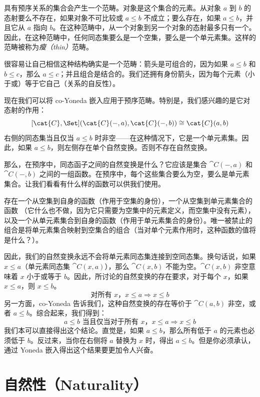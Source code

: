 具有预序关系的集合会产生一个范畴。对象是这个集合的元素。从对象 $a$ 到 $b$ 的态射要么不存在，如果对象不可比较或 $a \leqslant b$ 不成立；要么存在，如果 $a \leqslant b$，并且它从 $a$ 指向 $b$。在这种范畴中，从一个对象到另一个对象的态射最多只有一个。因此，在这种范畴中，任何同态集要么是一个空集，要么是一个单元素集。这样的范畴被称为\emph{瘦（thin）}范畴。

很容易让自己相信这种结构确实是一个范畴：箭头是可组合的，因为如果 $a \leqslant b$ 和 $b \leqslant c$，那么 $a \leqslant c$；并且组合是结合的。我们还拥有身份箭头，因为每个元素（小于或）等于它自己（关系的自反性）。

现在我们可以将 co-Yoneda 嵌入应用于预序范畴。特别是，我们感兴趣的是它对态射的作用：
\[[\cat{C}, \Set](\cat{C}(-, a), \cat{C}(-, b)) \cong \cat{C}(a, b)\]
右侧的同态集当且仅当 $a \leqslant b$ 时非空——在这种情况下，它是一个单元素集。因此，如果 $a \leqslant b$，则左侧存在单个自然变换。否则不存在自然变换。

那么，在预序中，同态函子之间的自然变换是什么？它应该是集合 $\cat{C}(-, a)$ 和 $\cat{C}(-, b)$ 之间的一组函数。在预序中，每个这些集合要么为空，要么是单元素集合。让我们看看有什么样的函数可以供我们使用。

存在一个从空集到自身的函数（作用于空集的身份），一个从空集到单元素集合的函数 （它什么也不做，因为它只需要为空集中的元素定义，而空集中没有元素），以及一个从单元素集合到自身的函数（作用于单元素集合的身份）。唯一被禁止的组合是将单元素集合映射到空集合的组合（当对单个元素作用时，这种函数的值将是什么？）。

因此，我们的自然变换永远不会将单元素同态集连接到空同态集。换句话说，如果 $x \leqslant a$（单元素同态集 $\cat{C}(x, a)$），那么 $\cat{C}(x, b)$ 不能为空。$\cat{C}(x, b)$ 非空意味着 $x$ 小于或等于 $b$。因此，所讨论的自然变换的存在要求，对于每个 $x$，如果 $x \leqslant a$，则 $x \leqslant b$。
\[\text{对所有 } x，x \leqslant a \Rightarrow x \leqslant b\]
另一方面，co-Yoneda 告诉我们，这种自然变换的存在等价于 $\cat{C}(a, b)$ 非空，或者 $a \leqslant b$。综合起来，我们得到：
\[a \leqslant b \text{ 当且仅当对于所有 } x，x \leqslant a \Rightarrow x \leqslant b\]
我们本可以直接得出这个结论。直觉是，如果 $a \leqslant b$，那么所有低于 $a$ 的元素也必须低于 $b$。反过来，当你在右侧将 $a$ 替换为 $x$ 时，得出 $a \leqslant b$。但是你必须承认，通过 Yoneda 嵌入得出这个结果要更加令人兴奋。

\section{自然性（Naturality）}

